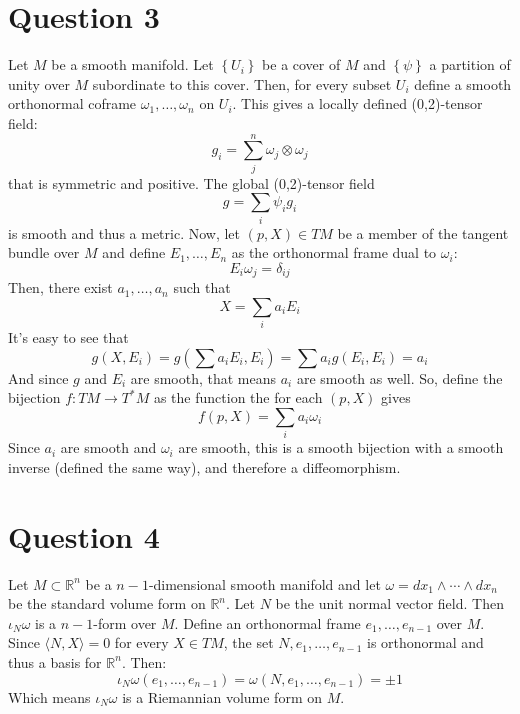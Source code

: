 \documentclass{article}
\newcommand{\R}{\ensuremath{\mathbb{R}}}
\begin{document}
\section*{Question 3}
Let $M$ be a smooth manifold. Let $\left\{U_i\right\}$ be a cover of $M$ and $\left\{\psi\right\}$ a partition of unity over $M$ subordinate to this cover. Then, for every subset $U_i$ define a smooth orthonormal coframe $\omega_1,\dots,\omega_n$ on $U_i$. This gives a locally defined (0,2)-tensor field:
\begin{equation}
    g_i = \sum_j^n \omega_j \otimes \omega_j
\end{equation}
that is symmetric and positive. The global (0,2)-tensor field
\begin{equation}
    g = \sum_i \psi_i g_i
\end{equation}
is smooth and thus a metric.
\newline
Now, let $(p, X) \in TM$ be a member of the tangent bundle over $M$ and define $E_1, \dots, E_n$ as the orthonormal frame dual to $\omega_i$:
\begin{equation}
    E_i\omega_j = \delta_{ij}
\end{equation}
Then, there exist $a_1, \dots, a_n$ such that
\begin{equation}
    X = \sum_i a_i E_i
\end{equation}
It's easy to see that
\begin{equation}
    g(X, E_i) = g(\sum a_i E_i, E_i) = \sum a_i g(E_i, E_i) = a_i
\end{equation}
And since $g$ and $E_i$ are smooth, that means $a_i$ are smooth as well. So, define the bijection $f: TM \rightarrow T^*M$ as the function the for each $(p, X)$ gives
\begin{equation}
    f(p, X) = \sum_i a_i \omega_i
\end{equation}
Since $a_i$ are smooth and $\omega_i$ are smooth, this is a smooth bijection with a smooth inverse (defined the same way), and therefore a diffeomorphism.

\section*{Question 4}
Let $M \subset \R^n$ be a $n-1$-dimensional smooth manifold and let $\omega = dx_1 \wedge \cdots \wedge dx_n$ be the standard volume form on $\R^n$. Let $N$ be the unit normal vector field. Then $\iota_N \omega$ is a $n-1$-form over $M$. Define an orthonormal frame $e_1, \dots, e_{n-1}$ over $M$. Since $\langle N, X \rangle = 0$ for every $X \in TM$, the set $N, e_1, \dots, e_{n-1}$ is orthonormal and thus a basis for $\R^n$.
Then:
\begin{equation}
    \iota_N \omega(e_1, \dots, e_{n-1}) = \omega(N, e_1, \dots, e_{n-1}) = \pm 1
\end{equation}
Which means $\iota_N \omega$ is a Riemannian volume form on $M$.
\end{document}
